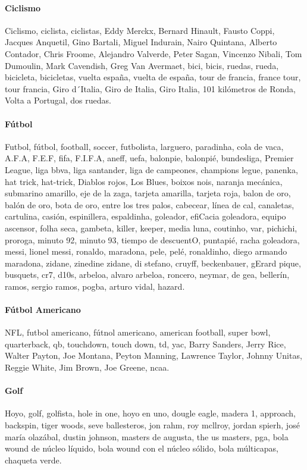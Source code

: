 \documentclass[../all.tex]{subfiles}
\begin{document}
    \paragraph{Ciclismo}
    Ciclismo, ciclista, ciclistas, Eddy Merckx, Bernard Hinault, Fausto Coppi, Jacques Anquetil, Gino Bartali, Miguel Indurain, Nairo Quintana, Alberto Contador, Chris Froome, Alejandro Valverde, Peter Sagan, Vincenzo Nibali, Tom Dumoulin, Mark Cavendish, Greg Van Avermaet, bici, bicis, ruedas, rueda, bicicleta, bicicletas, vuelta españa, vuelta de españa, tour de francia, france tour, tour francia, Giro d´Italia, Giro de Italia, Giro Italia, 101 kilómetros de Ronda, Volta a Portugal, dos ruedas.
    \paragraph{Fútbol}
    Futbol, fútbol, football, soccer, futbolista, larguero, paradinha, cola de vaca, A.F.A, F.E.F, fifa, F.I.F.A, aneff, uefa, balonpie, balonpié, bundesliga, Premier League, liga bbva, liga santander, liga de campeones, champions legue, panenka, hat trick, hat-trick, Diablos rojos, Los Blues, boixos nois, naranja mecánica, submarino amarillo, eje de la zaga, tarjeta amarilla, tarjeta roja, balon de oro, balón de oro, bota de oro, entre los tres palos, cabecear, línea de cal, canaletas, cartulina, casión, espinillera, espaldinha, goleador, efiCacia goleadora, equipo ascensor, folha seca, gambeta, killer, keeper, media luna, coutinho, var, pichichi, proroga, minuto 92, minuto 93, tiempo de descuentO, puntapié, racha goleadora, messi, lionel messi, ronaldo, maradona, pele, pelé, ronaldinho, diego armando maradona, zidane, zinedine zidane, di stefano, cruyff, beckenbauer, gErard pique, busquets, cr7, d10s, arbeloa, alvaro arbeloa, roncero, neymar, de gea, bellerín, ramos, sergio ramos, pogba, arturo vidal, hazard.
    \paragraph{Fútbol Americano}
    NFL, futbol americano, fútnol americano, american football, super bowl, quarterback, 
    qb, touchdown, touch down, td, yac, Barry Sanders, Jerry Rice, Walter Payton, Joe Montana, Peyton Manning, Lawrence Taylor, Johnny Unitas, Reggie White, Jim Brown, Joe Greene, ncaa.
    \paragraph{Golf}
    Hoyo, golf, golfista, hole in one, hoyo en uno, dougle eagle, madera 1, approach, backspin, tiger woods, seve ballesteros, jon rahm, roy mcllroy, jordan spierh, josé maría olazábal, dustin johnson, masters de augusta, the us masters, pga, bola wound de núcleo líquido, bola wound con el núcleo sólido, bola múlticapas, chaqueta verde.
\end{document}

